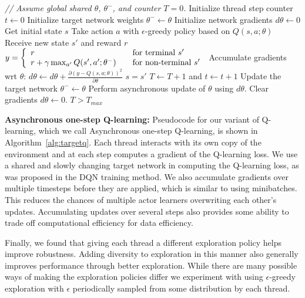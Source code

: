 %

\begin{algorithm}[t]
\caption{Asynchronous one-step Q-learning - pseudocode for each actor-learner thread.}
\begin{algorithmic}
\small
\State \emph{// Assume global shared $\theta$, $\theta^-$, and counter $T=0$.}
%
\State Initialize thread step counter $t\gets 0$
\State Initialize target network weights $\theta^- \gets \theta$
\State Initialize network gradients $d\theta \gets 0$
\State Get initial state $s$
\Repeat
\State Take action $a$ with $\epsilon$-greedy policy based on $Q(s,a;\theta)$
\State Receive new state $s'$ and reward $r$
\State $y =
    \left\{
    \begin{array}{l l}
      r  \quad & \text{for terminal } s'\\
      r + \gamma \max_{a'} Q(s', a'; \theta^-) \quad & \text{for non-terminal } s'
    \end{array} \right.$
\State Accumulate gradients wrt $\theta$: $d\theta \gets d\theta + \frac{\partial\left(y - Q(s,a;\theta)\right)^2}{\partial \theta}$
\State $s=s'$
\State $T \gets T + 1$ and $t \gets t + 1$
\State Update the target network $\theta^- \gets \theta$ 
\EndIf
{}
\State Perform asynchronous update of $\theta$ using $d\theta$.
\State Clear gradients $d\theta \gets 0$.
\EndIf
\Until $T > T_{max}$
\end{algorithmic}
\label{alg:targetq}
\end{algorithm}

\textbf{Asynchronous one-step Q-learning:}
Pseudocode for our variant of Q-learning, which we call Asynchronous one-step Q-learning, is shown in Algorithm~\ref{alg:targetq}.
Each thread interacts with its own copy of the environment and at each step computes a gradient of the Q-learning loss.
%
We use a shared and slowly changing target network in computing the Q-learning loss, as was proposed in the DQN training method.
%
We also accumulate gradients over multiple timesteps before they are applied, which is similar to using minibatches.
This reduces the chances of multiple actor learners overwriting each other's updates.
%
Accumulating updates over several steps also provides some ability to trade off computational efficiency for data efficiency.

%
Finally, we found that giving each thread a different exploration policy helps improve robustness.
Adding diversity to exploration in this manner also generally improves performance through better exploration.
While there are many possible ways of making the exploration policies differ we experiment with using $\epsilon$-greedy exploration with $\epsilon$ periodically sampled from some distribution by each thread.

